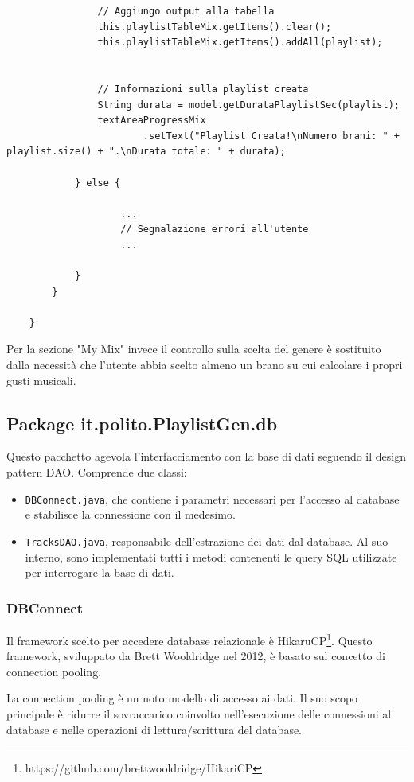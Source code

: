 \documentclass[12pt, a4paper]{article}
\begin{document}
\begin{itemize}
\begin{lstlisting}
				// Aggiungo output alla tabella
				this.playlistTableMix.getItems().clear();
				this.playlistTableMix.getItems().addAll(playlist);


				// Informazioni sulla playlist creata
				String durata = model.getDurataPlaylistSec(playlist);
				textAreaProgressMix
						.setText("Playlist Creata!\nNumero brani: " + playlist.size() + ".\nDurata totale: " + durata);

			} else {
				
					...
					// Segnalazione errori all'utente
					...
					
			}
		}

	}
\end{lstlisting}
Per la sezione "My Mix" invece il controllo sulla scelta del genere è sostituito dalla necessità che l'utente abbia scelto almeno un brano su cui calcolare i propri gusti musicali.
\end{itemize}

\newpage
\subsection{Package it.polito.PlaylistGen.db}


Questo pacchetto agevola l'interfacciamento con la base di dati seguendo il design pattern DAO. Comprende due classi:
\begin{itemize}
\item \texttt{DBConnect.java}, che contiene i parametri necessari per l'accesso al database e stabilisce la connessione con il medesimo.
\item \texttt{TracksDAO.java}, responsabile dell'estrazione dei dati dal database. Al suo interno, sono implementati tutti i metodi contenenti le query SQL utilizzate per interrogare la base di dati.
\end{itemize}

\subsubsection{DBConnect}

Il framework scelto per accedere database relazionale è HikaruCP\footnote{https://github.com/brettwooldridge/HikariCP}. Questo framework, sviluppato da Brett Wooldridge nel 2012, è basato sul concetto di connection pooling.

La connection pooling è un noto modello di accesso ai dati. Il suo scopo principale è ridurre il sovraccarico coinvolto nell'esecuzione delle connessioni al database e nelle operazioni di lettura/scrittura del database.
\end{document}
